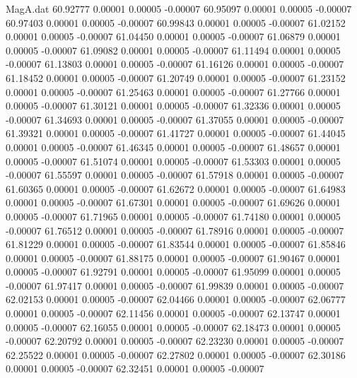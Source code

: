 \begin{filecontents}{MagA.dat}
  60.92777    0.00001    0.00005   -0.00007
  60.95097    0.00001    0.00005   -0.00007
  60.97403    0.00001    0.00005   -0.00007
  60.99843    0.00001    0.00005   -0.00007
  61.02152    0.00001    0.00005   -0.00007
  61.04450    0.00001    0.00005   -0.00007
  61.06879    0.00001    0.00005   -0.00007
  61.09082    0.00001    0.00005   -0.00007
  61.11494    0.00001    0.00005   -0.00007
  61.13803    0.00001    0.00005   -0.00007
  61.16126    0.00001    0.00005   -0.00007
  61.18452    0.00001    0.00005   -0.00007
  61.20749    0.00001    0.00005   -0.00007
  61.23152    0.00001    0.00005   -0.00007
  61.25463    0.00001    0.00005   -0.00007
  61.27766    0.00001    0.00005   -0.00007
  61.30121    0.00001    0.00005   -0.00007
  61.32336    0.00001    0.00005   -0.00007
  61.34693    0.00001    0.00005   -0.00007
  61.37055    0.00001    0.00005   -0.00007
  61.39321    0.00001    0.00005   -0.00007
  61.41727    0.00001    0.00005   -0.00007
  61.44045    0.00001    0.00005   -0.00007
  61.46345    0.00001    0.00005   -0.00007
  61.48657    0.00001    0.00005   -0.00007
  61.51074    0.00001    0.00005   -0.00007
  61.53303    0.00001    0.00005   -0.00007
  61.55597    0.00001    0.00005   -0.00007
  61.57918    0.00001    0.00005   -0.00007
  61.60365    0.00001    0.00005   -0.00007
  61.62672    0.00001    0.00005   -0.00007
  61.64983    0.00001    0.00005   -0.00007
  61.67301    0.00001    0.00005   -0.00007
  61.69626    0.00001    0.00005   -0.00007
  61.71965    0.00001    0.00005   -0.00007
  61.74180    0.00001    0.00005   -0.00007
  61.76512    0.00001    0.00005   -0.00007
  61.78916    0.00001    0.00005   -0.00007
  61.81229    0.00001    0.00005   -0.00007
  61.83544    0.00001    0.00005   -0.00007
  61.85846    0.00001    0.00005   -0.00007
  61.88175    0.00001    0.00005   -0.00007
  61.90467    0.00001    0.00005   -0.00007
  61.92791    0.00001    0.00005   -0.00007
  61.95099    0.00001    0.00005   -0.00007
  61.97417    0.00001    0.00005   -0.00007
  61.99839    0.00001    0.00005   -0.00007
  62.02153    0.00001    0.00005   -0.00007
  62.04466    0.00001    0.00005   -0.00007
  62.06777    0.00001    0.00005   -0.00007
  62.11456    0.00001    0.00005   -0.00007
  62.13747    0.00001    0.00005   -0.00007
  62.16055    0.00001    0.00005   -0.00007
  62.18473    0.00001    0.00005   -0.00007
  62.20792    0.00001    0.00005   -0.00007
  62.23230    0.00001    0.00005   -0.00007
  62.25522    0.00001    0.00005   -0.00007
  62.27802    0.00001    0.00005   -0.00007
  62.30186    0.00001    0.00005   -0.00007
  62.32451    0.00001    0.00005   -0.00007

\end{filecontents}
